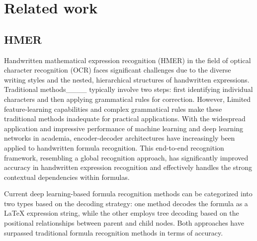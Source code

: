 \section{Related work}
\label{sec2}
\subsection{HMER} \label{sec2.1}
Handwritten mathematical expression recognition (HMER) in the field of optical character recognition (OCR) faces significant challenges due to the diverse writing styles and the nested, hierarchical structures of handwritten expressions. Traditional methods____ typically involve two steps: first identifying individual characters and then applying grammatical rules for correction. However, Limited feature-learning capabilities and complex grammatical rules make these traditional methods inadequate for practical applications. With the widespread application and impressive performance of machine learning and deep learning networks in academia, encoder-decoder architectures have increasingly been applied to handwritten formula recognition. This end-to-end recognition framework, resembling a global recognition approach, has significantly improved accuracy in handwritten expression recognition and effectively handles the strong contextual dependencies within formulas. 

Current deep learning-based formula recognition methods can be categorized into two types based on the decoding strategy: one method decodes the formula as a LaTeX expression string, while the other employs tree decoding based on the positional relationships between parent and child nodes. Both approaches have surpassed traditional formula recognition methods in terms of accuracy.

